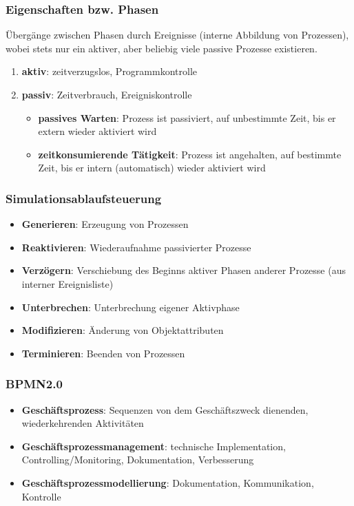 \documentclass{article}
\begin{document}
\subsubsection{Eigenschaften bzw. Phasen}
Übergänge zwischen Phasen durch Ereignisse (interne Abbildung von Prozessen), wobei stets nur ein aktiver, aber beliebig viele passive Prozesse existieren.
\begin{enumerate}
  \item \textbf{aktiv}: zeitverzugslos, Programmkontrolle
  \item \textbf{passiv}: Zeitverbrauch, Ereigniskontrolle
        \begin{itemize}
          \item \textbf{passives Warten}: Prozess ist passiviert, auf unbestimmte Zeit, bis er extern wieder aktiviert wird
          \item \textbf{zeitkonsumierende Tätigkeit}: Prozess ist angehalten, auf bestimmte Zeit, bis er intern (automatisch) wieder aktiviert wird
        \end{itemize}
\end{enumerate}

\subsubsection{Simulationsablaufsteuerung}
\begin{itemize}
  \item \textbf{Generieren}: Erzeugung von Prozessen
  \item \textbf{Reaktivieren}: Wiederaufnahme passivierter Prozesse
  \item \textbf{Verzögern}: Verschiebung des Beginns aktiver Phasen anderer Prozesse (aus interner Ereignisliste)
  \item \textbf{Unterbrechen}: Unterbrechung eigener Aktivphase
  \item \textbf{Modifizieren}: Änderung von Objektattributen
  \item \textbf{Terminieren}: Beenden von Prozessen
\end{itemize}

\subsubsection{BPMN2.0}\label{subsec:bpmn}
\begin{itemize}
  \item \textbf{Geschäftsprozess}: Sequenzen von dem Geschäftszweck dienenden, wiederkehrenden Aktivitäten
  \item \textbf{Geschäftsprozessmanagement}: technische Implementation, Controlling/Monitoring, Dokumentation, Verbesserung
  \item \textbf{Geschäftsprozessmodellierung}: Dokumentation, Kommunikation, Kontrolle
\end{itemize}
\end{document}
